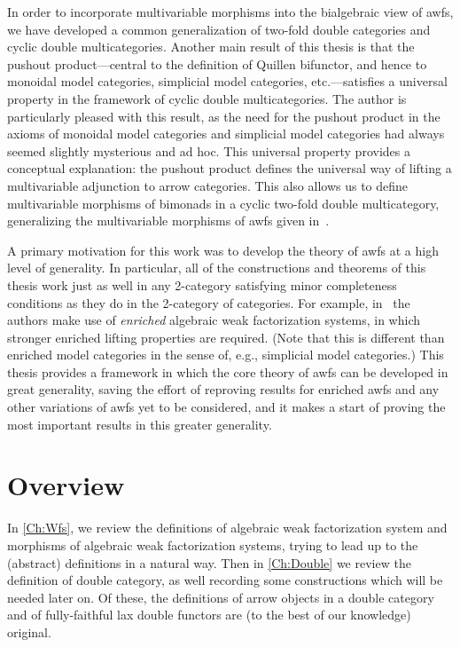 In order to incorporate multivariable morphisms into the bialgebraic view of awfs, we have developed a common generalization of two-fold double categories and cyclic double multicategories. Another main result of this thesis is that the pushout product---central to the definition of Quillen bifunctor, and hence to monoidal model categories, simplicial model categories, etc.---satisfies a universal property in the framework of cyclic double multicategories. The author is particularly pleased with this result, as the need for the pushout product in the axioms of monoidal model categories and simplicial model categories had always seemed slightly mysterious and ad hoc. This universal property provides a conceptual explanation: the pushout product defines the universal way of lifting a multivariable adjunction to arrow categories. This also allows us to define multivariable morphisms of bimonads in a cyclic two-fold double multicategory, generalizing the multivariable morphisms of awfs given in~\cite{riehl:nwfs-monoidal}.

A primary motivation for this work was to develop the theory of awfs at a high level of generality. In particular, all of the constructions and theorems of this thesis work just as well in any 2-category satisfying minor completeness conditions as they do in the 2-category of categories. For example, in~\cite{bmr:six} the authors make use of \emph{enriched} algebraic weak factorization systems, in which stronger enriched lifting properties are required. (Note that this is different than enriched model categories in the sense of, e.g., simplicial model categories.) This thesis provides a framework in which the core theory of awfs can be developed in great generality, saving the effort of reproving results for enriched awfs and any other variations of awfs yet to be considered, and it makes a start of proving the most important results in this greater generality.

\section*{Overview}

In \cref{Ch:Wfs}, we review the definitions of algebraic weak factorization system and morphisms of algebraic weak factorization systems, trying to lead up to the (abstract) definitions in a natural way. Then in \cref{Ch:Double} we review the definition of double category, as well recording some constructions which will be needed later on. Of these, the definitions of arrow objects in a double category and of fully-faithful lax double functors are (to the best of our knowledge) original.


